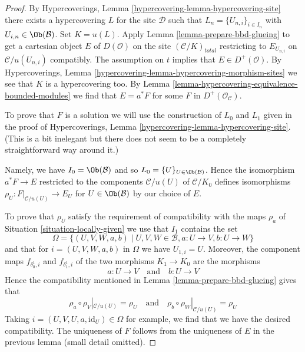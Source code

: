 \begin{proof}
By Hypercoverings, Lemma \ref{hypercovering-lemma-hypercovering-site}
there exists a hypercovering $L$ for the site $\mathcal{D}$ such that
$L_n = \{U_{n, i}\}_{i \in I_n}$ with $U_{i, n} \in \Ob(\mathcal{B})$.
Set $K = u(L)$. Apply Lemma \ref{lemma-prepare-bbd-glueing}
to get a cartesian object $E$ of $D(\mathcal{O})$ on the site
$(\mathcal{C}/K)_{total}$ restricting to $E_{U_{n, i}}$ on
$\mathcal{C}/u(U_{n, i})$ compatibly.
The assumption on $t$ implies that $E \in D^+(\mathcal{O})$.
By Hypercoverings, Lemma \ref{hypercovering-lemma-hypercovering-morphism-sites}
we see that $K$ is a hypercovering too.
By Lemma \ref{lemma-hypercovering-equivalence-bounded-modules}
we find that $E = a^*F$ for some $F$ in $D^+(\mathcal{O}_\mathcal{C})$.

\medskip\noindent
To prove that $F$ is a solution we will use the construction of
$L_0$ and $L_1$ given in the proof of
Hypercoverings, Lemma \ref{hypercovering-lemma-hypercovering-site}.
(This is a bit inelegant but there does not seem to be a completely
straightforward way around it.)

\medskip\noindent
Namely, we have $I_0 = \Ob(\mathcal{B})$ and so
$L_0 = \{U\}_{U \in \Ob(\mathcal{B})}$.
Hence the isomorphism $a^*F \to E$ restricted to the components
$\mathcal{C}/u(U)$ of $\mathcal{C}/K_0$ defines isomorphisms
$\rho_U : F|_{\mathcal{C}/u(U)} \to E_U$ for $U \in \Ob(\mathcal{B})$
by our choice of $E$.

\medskip\noindent
To prove that $\rho_U$ satisfy the requirement of compatibility
with the maps $\rho_a$ of Situation \ref{situation-locally-given}
we use that $I_1$ contains the set
$$
\Omega =
\{(U, V, W, a, b) \mid U, V, W \in \mathcal{B}, a : U \to V, b : U \to W\}
$$
and that for $i = (U, V, W, a, b)$ in $\Omega$ we have
$U_{1, i} = U$. Moreover, the component maps $f_{\delta^1_0, i}$ and
$f_{\delta^1_1, i}$ of the two morphisms $K_1 \to K_0$ are the morphisms
$$
a : U \to V \quad\text{and}\quad b : U \to V
$$
Hence the compatibility mentioned in
Lemma \ref{lemma-prepare-bbd-glueing} gives that
$$
\rho_a \circ \rho_V|_{\mathcal{C}/u(U)} = \rho_U
\quad\text{and}\quad
\rho_b \circ \rho_W|_{\mathcal{C}/u(U)} = \rho_U
$$
Taking $i = (U, V, U, a, \text{id}_U) \in \Omega$ for example, we find
that we have the desired compatibility. The uniqueness of $F$ follows
from the uniqueness of $E$ in the previous lemma (small detail omitted).
\end{proof}

